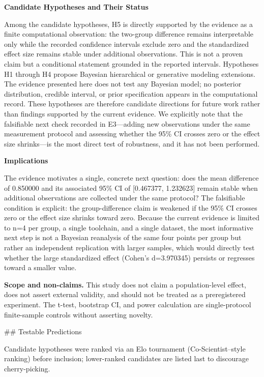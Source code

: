 \documentclass[11pt,a4paper]{article}
\begin{document}
\textbf{Candidate Hypotheses and Their Status}

Among the candidate hypotheses, H5 is directly supported by the evidence as a finite computational observation: the two-group difference remains interpretable only while the recorded confidence intervals exclude zero and the standardized effect size remains stable under additional observations. This is not a proven claim but a conditional statement grounded in the reported intervals. Hypotheses H1 through H4 propose Bayesian hierarchical or generative modeling extensions. The evidence presented here does not test any Bayesian model; no posterior distribution, credible interval, or prior specification appears in the computational record. These hypotheses are therefore candidate directions for future work rather than findings supported by the current evidence. We explicitly note that the falsifiable next check recorded in E3—adding new observations under the same measurement protocol and assessing whether the 95\% CI crosses zero or the effect size shrinks—is the most direct test of robustness, and it has not been performed.

\textbf{Implications}

The evidence motivates a single, concrete next question: does the mean difference of 0.850000 and its associated 95\% CI of [0.467377, 1.232623] remain stable when additional observations are collected under the same protocol? The falsifiable condition is explicit: the group-difference claim is weakened if the 95\% CI crosses zero or the effect size shrinks toward zero. Because the current evidence is limited to n=4 per group, a single toolchain, and a single dataset, the most informative next step is not a Bayesian reanalysis of the same four points per group but rather an independent replication with larger samples, which would directly test whether the large standardized effect (Cohen's d=3.970345) persists or regresses toward a smaller value.

\textbf{Scope and non-claims.} This study does not claim a population-level effect, does not assert external validity, and should not be treated as a preregistered experiment. The t-test, bootstrap CI, and power calculation are single-protocol finite-sample controls without asserting novelty.

\#\# Testable Predictions

Candidate hypotheses were ranked via an Elo tournament (Co-Scientist–style ranking) before inclusion; lower-ranked candidates are listed last to discourage cherry-picking.
\end{document}
